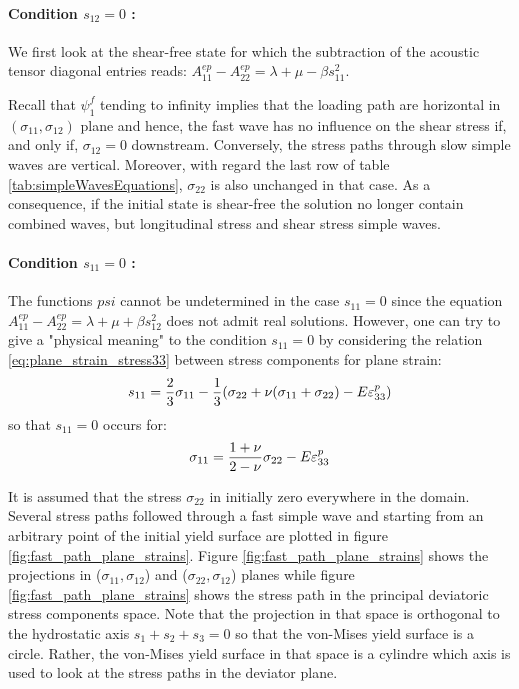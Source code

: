 \paragraph*{Condition $s_{12}=0$ :} 
We first look at the shear-free state for which the subtraction of the acoustic tensor diagonal entries reads: $A_{11}^{ep}-A_{22}^{ep}=\lambda + \mu -\beta s_{11}^2$. 

Recall that $\psi^f_1$ tending to infinity implies that the loading path are horizontal in $(\sigma_{11},\sigma_{12})$ plane and hence, the fast wave has no influence on the shear stress if, and only if, $\sigma_{12}=0$ downstream. Conversely, the stress paths through slow simple waves are vertical. Moreover, with regard the last row of table \ref{tab:simpleWavesEquations}, $\sigma_{22}$ is also unchanged in that case. As a consequence, if the initial state is shear-free the solution no longer contain combined waves, but longitudinal stress and shear stress simple waves.

\paragraph*{Condition $s_{11}=0$ :} The functions $psi$ cannot be undetermined in the case $s_{11}=0$ since the equation $A_{11}^{ep}-A_{22}^{ep}=\lambda + \mu + \beta s_{12}^2$ does not admit real solutions.
However, one can try to give a "physical meaning" to the condition $s_{11}=0$ by considering the relation \eqref{eq:plane_strain_stress33} between stress components for plane strain:
\begin{equation*}
  s_{11}= \frac{2}{3}\sigma_{11}-\frac{1}{3}(\sigma_{22}+\nu(\sigma_{11}+\sigma_{22})-E\varepsilon^p_{33})
\end{equation*}
so that $s_{11}=0$ occurs for:
\begin{equation}
  \label{eq:plane_strain_s11=0}
  \sigma_{11}=\frac{1+\nu}{2-\nu}\sigma_{22}-E\varepsilon^p_{33}
\end{equation}

It is assumed that the stress $\sigma_{22}$ in initially zero everywhere in the domain. Several stress paths followed through a fast simple wave and starting from an arbitrary point of the initial yield surface are plotted in figure \ref{fig:fast_path_plane_strains}. Figure \ref{fig:fast_path_plane_strains} shows the projections in ($\sigma_{11},\sigma_{12}$) and ($\sigma_{22},\sigma_{12}$) planes while figure \ref{fig:fast_path_plane_strains} shows the stress path in the principal deviatoric stress components space. Note that the projection in that space is orthogonal to the hydrostatic axis $s_1+s_2+s_3=0$ so that the von-Mises yield surface is a circle. Rather, the von-Mises yield surface in that space is a cylindre which axis is used to look at the stress paths in the deviator plane.


